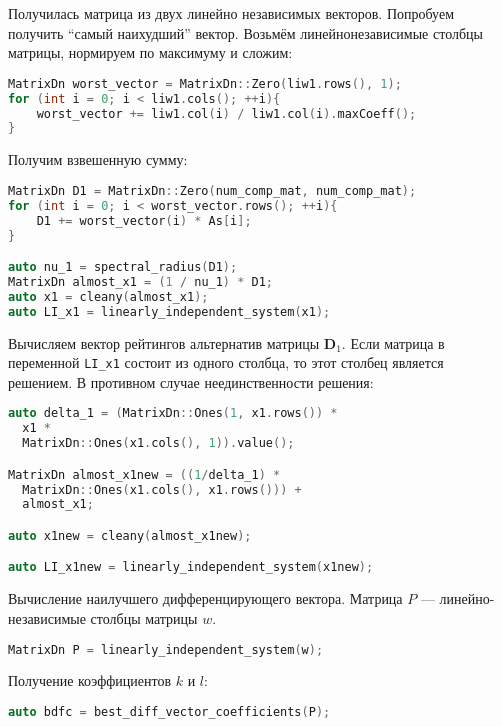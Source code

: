 \documentclass[specialist,
	substylefile = spbu.rtx,
	subf,href,colorlinks=true, 12pt]{disser}
\begin{document}
Получилась матрица из двух линейно независимых векторов. Попробуем получить \enquote{самый наихудший} вектор. Возьмём линейнонезависимые столбцы матрицы, нормируем по максимуму и сложим:
\begin{lstlisting}[language=c++,basicstyle=\footnotesize\ttfamily]
MatrixDn worst_vector = MatrixDn::Zero(liw1.rows(), 1);
for (int i = 0; i < liw1.cols(); ++i){
    worst_vector += liw1.col(i) / liw1.col(i).maxCoeff();
}
\end{lstlisting}


Получим взвешенную сумму:
\begin{lstlisting}[language=c++,basicstyle=\footnotesize\ttfamily]
MatrixDn D1 = MatrixDn::Zero(num_comp_mat, num_comp_mat);
for (int i = 0; i < worst_vector.rows(); ++i){
    D1 += worst_vector(i) * As[i];
}

auto nu_1 = spectral_radius(D1);
MatrixDn almost_x1 = (1 / nu_1) * D1;
auto x1 = cleany(almost_x1);
auto LI_x1 = linearly_independent_system(x1);
\end{lstlisting}

Вычисляем вектор рейтингов альтернатив матрицы $\mathbf{D}_{1}$.
Если матрица в переменной \texttt{LI\_x1} состоит из одного столбца, то этот столбец является решением. В противном случае неединственности решения:

\begin{lstlisting}[language=c++,basicstyle=\footnotesize\ttfamily]
auto delta_1 = (MatrixDn::Ones(1, x1.rows()) *
  x1 *
  MatrixDn::Ones(x1.cols(), 1)).value();

MatrixDn almost_x1new = ((1/delta_1) *
  MatrixDn::Ones(x1.cols(), x1.rows())) +
  almost_x1;

auto x1new = cleany(almost_x1new);

auto LI_x1new = linearly_independent_system(x1new);
\end{lstlisting}

Вычисление наилучшего дифференцирующего вектора.
Матрица $P$ --- линейно-независимые столбцы матрицы $w$.
\begin{lstlisting}[language=c++,basicstyle=\footnotesize\ttfamily]
MatrixDn P = linearly_independent_system(w);
\end{lstlisting}

Получение коэффициентов $k$ и $l$:
\begin{lstlisting}[language=c++,basicstyle=\footnotesize\ttfamily]
auto bdfc = best_diff_vector_coefficients(P);
\end{lstlisting}
\end{document}
